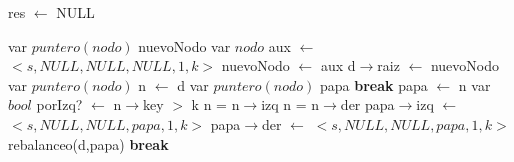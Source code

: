 \begin{algorithm}\phantom{[H]}
\begin{algorithmic}[1]
  \State res $\gets$ NULL 
\EndFunction
\end{algorithmic}
\end{algorithm} 



\begin{algorithm}\phantom{[H]}
\begin{algorithmic}[1]
      \State var $puntero(nodo)$ nuevoNodo 
      \State var $nodo$ aux $\gets$ $<s, NULL, NULL, NULL, 1, k>$ 
      \State *nuevoNodo $\gets$ aux 
      \State d$\rightarrow$raiz $\gets$ nuevoNodo 
   \Else 
      \State var $puntero(nodo)$ n $\gets$ d 
      \State var $puntero(nodo)$ papa 
       
       
        \State \textbf{break} 
      \EndIf
      \State papa $\gets$ n 
      \State var $bool$ porIzq? $\gets$  n$\rightarrow$key $>$ k 
       
        \State n = n$\rightarrow$izq 
      \Else
        \State n = n$\rightarrow$der 
      \EndIf
       
         
          \State papa$\rightarrow$izq $\gets$ $<s, NULL, NULL, papa, 1, k>$ 
        \Else
          \State papa$\rightarrow$der $\gets$ $<s, NULL, NULL, papa, 1, k>$ 
        \EndIf
        \State rebalanceo(d,papa) 
        \State \textbf{break} 
      \EndIf        
      \EndWhile
   \EndIf
\EndFunction
\end{algorithmic}
\end{algorithm}



